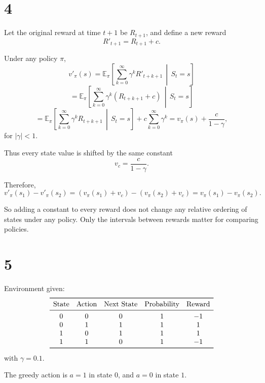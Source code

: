\documentclass[11pt]{article}
\begin{document}
\section*{4}

Let the original reward at time \(t+1\) be \(R_{t+1}\), and define a new reward
\[
R'_{t+1}=R_{t+1}+c.
\]

Under any policy \(\pi\),
\[
v'_{\pi}(s)
=
\mathbb{E}_{\pi}\!\left[\sum_{k=0}^{\infty}\gamma^k R'_{t+k+1}\,\middle|\,S_t=s\right]
\]
\[
=
\mathbb{E}_{\pi}\!\left[\sum_{k=0}^{\infty}\gamma^k (R_{t+k+1}+c)\,\middle|\,S_t=s\right]
\]
\[
=
\mathbb{E}_{\pi}\!\left[\sum_{k=0}^{\infty}\gamma^k R_{t+k+1}\,\middle|\,S_t=s\right]
+
c\sum_{k=0}^{\infty}\gamma^k
=
v_{\pi}(s)+\frac{c}{1-\gamma},
\]
for \(|\gamma|<1\).

Thus every state value is shifted by the same constant
\[
\boxed{v_c=\frac{c}{1-\gamma}.}
\]

Therefore,
\[
v'_{\pi}(s_1)-v'_{\pi}(s_2)
=
\left(v_{\pi}(s_1)+v_c\right)-\left(v_{\pi}(s_2)+v_c\right)
=
v_{\pi}(s_1)-v_{\pi}(s_2).
\]

So adding a constant to every reward does not change any relative ordering of states under
any policy. Only the intervals between rewards matter for comparing policies.

\section*{5}

Environment given:
\[
\begin{array}{c c c c c}
\toprule
\text{State} & \text{Action} & \text{Next State} & \text{Probability} & \text{Reward}\\
\midrule
0 & 0 & 0 & 1 & -1\\
0 & 1 & 1 & 1 & 1\\
1 & 0 & 1 & 1 & 1\\
1 & 1 & 0 & 1 & -1\\
\bottomrule
\end{array}
\]
with \(\gamma=0.1\).

The greedy action is \(a=1\) in state \(0\), and \(a=0\) in state \(1\).
\end{document}
